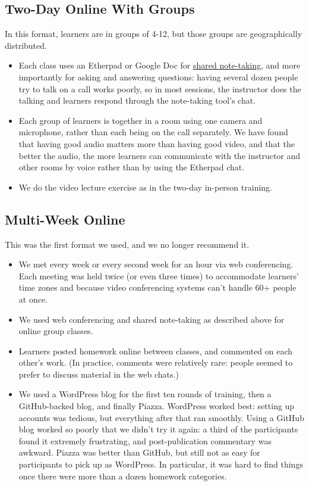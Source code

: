 \documentclass[10pt,statementpaper]{memoir}
\begin{document}
\subsection{Two-Day Online With
Groups}\label{two-day-online-with-groups}

In this format, learners are in groups of 4-12, but those groups are
geographically distributed.

\begin{itemize}
\item
  Each class uses an Etherpad or Google Doc for
  \href{practices.html\#take-notes-together}{shared note-taking}, and
  more importantly for asking and answering questions: having several
  dozen people try to talk on a call works poorly, so in most sessions,
  the instructor does the talking and learners respond through the
  note-taking tool's chat.
\item
  Each group of learners is together in a room using one camera and
  microphone, rather than each being on the call separately. We have
  found that having good audio matters more than having good video, and
  that the better the audio, the more learners can communicate with the
  instructor and other rooms by voice rather than by using the Etherpad
  chat.
\item
  We do the video lecture exercise as in the two-day in-person training.
\end{itemize}

\subsection{Multi-Week Online}\label{multi-week-online}

This was the first format we used, and we no longer recommend it.

\begin{itemize}
\item
  We met every week or every second week for an hour via web
  conferencing. Each meeting was held twice (or even three times) to
  accommodate learners' time zones and because video conferencing
  systems can't handle 60+ people at once.
\item
  We used web conferencing and shared note-taking as described above for
  online group classes.
\item
  Learners posted homework online between classes, and commented on each
  other's work. (In practice, comments were relatively rare: people
  seemed to prefer to discuss material in the web chats.)
\item
  We used a WordPress blog for the first ten rounds of training, then a
  GitHub-backed blog, and finally Piazza. WordPress worked best: setting
  up accounts was tedious, but everything after that ran smoothly. Using
  a GitHub blog worked so poorly that we didn't try it again: a third of
  the participants found it extremely frustrating, and post-publication
  commentary was awkward. Piazza was better than GitHub, but still not
  as easy for participants to pick up as WordPress. In particular, it
  was hard to find things once there were more than a dozen homework
  categories.
\end{itemize}
\end{document}

